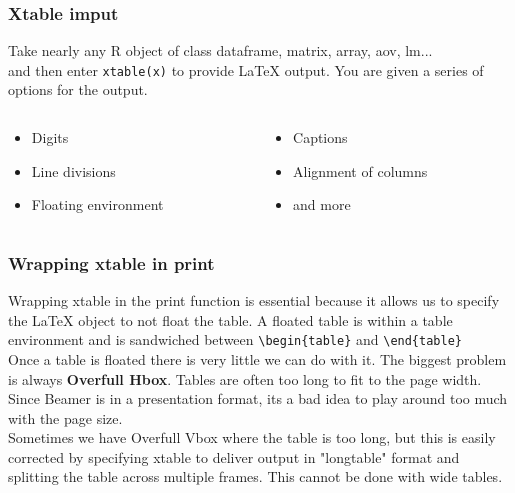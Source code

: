 \documentclass[nogin]{beamer}\usepackage[]{graphicx}\usepackage[]{color}
\begin{document}
\begin{frame}
\frametitle{Xtable imput}
\begin{block}{}
Take nearly any R object of class dataframe, matrix, array, aov, lm...\\
and then enter \verb|xtable(x)| to provide LaTeX output. You are given a series of options for the output.
\end{block}
\begin{columns}[T]
\begin{column}{.5\textwidth}
\begin{itemize}
\item Digits
\item Line divisions
\item Floating environment
\end{itemize}
\end{column}
\begin{column}{.5\textwidth}
\begin{itemize}
\item Captions
\item Alignment of columns
\item and more
\end{itemize}
\end{column}
\end{columns}
\end{frame}

\begin{frame}
\frametitle{Wrapping xtable in print}
\small
Wrapping xtable in the print function is essential because it allows us to specify the LaTeX object to not float the table. A floated table is within a table environment and is sandwiched between \verb|\begin{table}| and \verb|\end{table}|\\[\baselineskip]
Once a table is floated there is very little we can do with it. The biggest problem is always \textbf{Overfull Hbox}. Tables are often too long to fit to the page width. Since Beamer is in a presentation format, its a bad idea to play around too much with the page size.\\[\baselineskip]

Sometimes we have Overfull Vbox where the table is too long, but this is easily corrected by specifying xtable to deliver output in "longtable" format and splitting the table across multiple frames. This cannot be done with wide tables. 
\end{frame}
\end{document}
